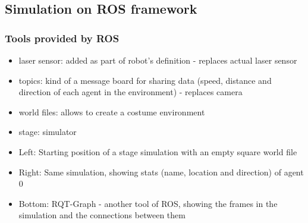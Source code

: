 \documentclass[a0,portrait]{a0poster}
\begin{document}
\begin{multicols}{2}
  \subsection*{Simulation on ROS framework}
  \subsubsection*{Tools provided by ROS}
  \begin{itemize}
  \item laser sensor: added as part of robot's definition - replaces actual laser sensor
  \item topics: kind of a message board for sharing data (speed, distance and direction of each agent in the environment) - replaces camera
  \item world files: allows to create a costume environment
  \item stage: simulator
  \end{itemize}


  \begin{itemize}
  \item Left: Starting position of a stage simulation with an empty square world file
  \item Right: Same simulation, showing stats (name, location and direction) of agent 0
  \item Bottom: RQT-Graph - another tool of ROS, showing the frames in the simulation and the connections between them
  \end{itemize}





\end{multicols}
\end{document}
